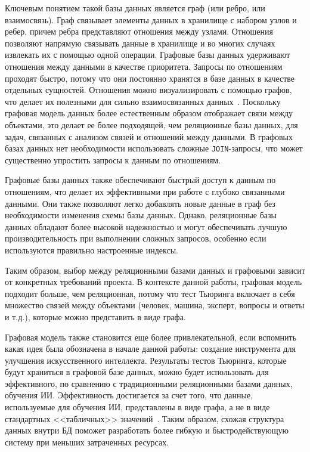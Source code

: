 Ключевым понятием такой базы данных является граф (или ребро, или взаимосвязь).
Граф связывает элементы данных в хранилище с набором узлов и ребер, причем ребра представляют отношения между узлами. 
Отношения позволяют напрямую связывать данные в хранилище и во многих случаях извлекать их с помощью одной операции. 
Графовые базы данных удерживают отношения между данными в качестве приоритета.
Запросы по отношениям проходят быстро, потому что они постоянно хранятся в базе данных в качестве отдельных сущностей.
Отношения можно визуализировать с помощью графов, что делает их полезными для сильно взаимосвязанных данных~\cite{graph-exp}.
Поскольку графовая модель данных более естественным образом отображает связи между объектами, это делает ее более подходящей, чем реляционные базы данных, для задач, связанных с анализом связей и отношений между данными.
В графовых базах данных нет необходимости использовать сложные \texttt{JOIN}-запросы, что может существенно упростить запросы к данным по отношениям.

Графовые базы данных также обеспечивают быстрый доступ к данным по отношениям, что делает их эффективными при работе с глубоко связанными данными. Они также позволяют легко добавлять новые данные в граф без необходимости изменения схемы базы данных.
Однако, реляционные базы данных обладают более высокой надежностью и могут обеспечивать лучшую производительность при выполнении сложных запросов, особенно если используются правильно настроенные индексы.

Таким образом, выбор между реляционными базами данных и графовыми зависит от конкретных требований проекта.
В контексте данной работы, графовая модель подходит больше, чем реляционная, потому что тест Тьюринга включает в себя множество связей между объектами (человек, машина, эксперт, вопросы и ответы и т.д.), которые можно представить в виде графа.

Графовая модель также становится еще более привлекательной, если вспомнить какая идея была обозначена в начале данной работы: создание инструмента для улучшения искусственного интеллекта.
Результаты тестов Тьюринга, которые будут храниться в графовой базе данных, можно будет использовать для эффективного, по сравнению с традиционными реляционными базами данных, обучения ИИ. 
Эффективность достигается за счет того, что данные, используемые для обучения ИИ, представлены в виде графа, а не в виде стандартных <<табличных>> значений~\cite{besta2022neural}. 
Таким образом, схожая структура данных внутри БД поможет разработать более гибкую и быстродействующую систему при меньших затраченных ресурсах.

